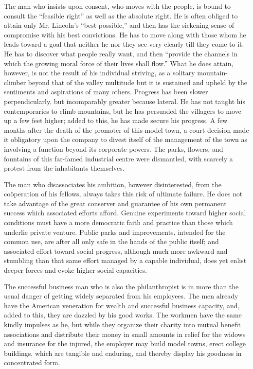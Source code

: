 \documentclass[]{article}
\begin{document}
\begin{sectionbody}
\addamsparagraph The man who insists upon consent, who moves with the people, is bound to
consult the ``feasible right'' as well as the absolute right. He is often
obliged to attain only Mr. Lincoln's ``best possible,'' and then has the
sickening sense of compromise with his best convictions. He has to move
along with those whom he leads toward a goal that neither he nor they
see very clearly till they come to it. He has to discover what people
really want, and then ``provide the channels in which the growing moral
force of their lives shall flow.'' What he does attain, however, is not
the result of his individual striving, as a solitary mountain-climber
beyond that of the valley multitude but it is sustained and upheld by
the sentiments and aspirations of many others. Progress has been slower
perpendicularly, but incomparably greater because lateral. He has not
taught his contemporaries to climb mountains, but he has persuaded the
villagers to move up a few feet higher; added to this, he has made
secure his progress. A few months after the death of the promoter of
this model town, a court decision made it obligatory upon the company to
divest itself of the management of the town as involving a function
beyond its corporate powers. The parks, flowers, and fountains of this
far-famed industrial centre were dismantled, with scarcely a protest
from the inhabitants themselves.

\addamsparagraph The man who disassociates his ambition, however disinterested, from the
coöperation of his fellows, always takes this risk of ultimate failure.
He does not take advantage of the great conserver and guarantee of his
own permanent success which associated efforts afford. Genuine
experiments toward higher social conditions must have a more democratic
faith and practice than those which underlie private venture. Public
parks and improvements, intended for the common use, are after all only
safe in the hands of the public itself; and associated effort toward
social progress, although much more awkward and stumbling than that same
effort managed by a capable individual, does yet enlist deeper forces
and evoke higher social capacities.

\addamsparagraph The successful business man who is also the philanthropist is in more
than the usual danger of getting widely separated from his employees.
The men already have the American veneration for wealth and successful
business capacity, and, added to this, they are dazzled by his good
works. The workmen have the same kindly impulses as he, but while they
organize their charity into mutual benefit associations and distribute
their money in small amounts in relief for the widows and insurance for
the injured, the employer may build model towns, erect college
buildings, which are tangible and enduring, and thereby display his
goodness in concentrated form.


\end{sectionbody}
\end{document}
